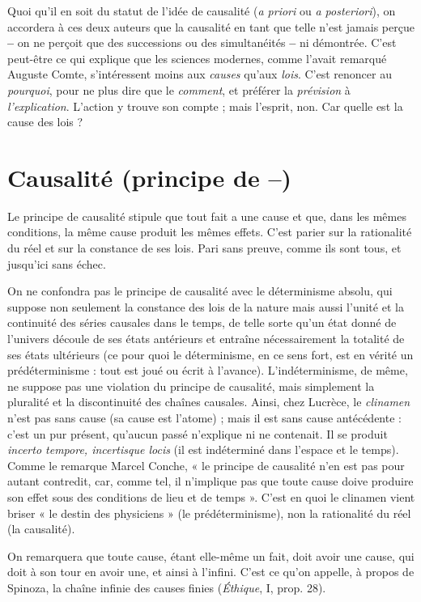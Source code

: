 Quoi qu'il en soit du statut de l’idée de causalité ({\it a priori} ou {\it a posteriori}),
on accordera à ces deux auteurs que la causalité en tant que telle n’est jamais
perçue {\bf --} on ne perçoit que des successions ou des simultanéités {\bf --} ni démontrée.
C’est peut-être ce qui explique que les sciences modernes, comme l'avait
remarqué Auguste Comte, s'intéressent moins aux {\it causes} qu'aux {\it lois}. C’est
renoncer au {\it pourquoi}, pour ne plus dire que le {\it comment}, et préférer la {\it prévision}
à {\it l'explication}. L'action y trouve son compte ; mais l'esprit, non. Car quelle est
la cause des lois ?

\section{Causalité (principe de {\bf --})}
Le principe de causalité stipule que tout
fait a une cause et que, dans les mêmes
conditions, la même cause produit les mêmes effets. C’est parier sur la rationalité
du réel et sur la constance de ses lois. Pari sans preuve, comme ils sont tous,
et jusqu'ici sans échec.

On ne confondra pas le principe de causalité avec le déterminisme absolu,
qui suppose non seulement la constance des lois de la nature mais aussi l’unité
et la continuité des séries causales dans le temps, de telle sorte qu’un état donné
de l'univers découle de ses états antérieurs et entraîne nécessairement la totalité
de ses états ultérieurs (ce pour quoi le déterminisme, en ce sens fort, est en
vérité un prédéterminisme : tout est joué ou écrit à l'avance). L’indéterminisme,
de même, ne suppose pas une violation du principe de causalité, mais
simplement la pluralité et la discontinuité des chaînes causales. Ainsi, chez
Lucrèce, le {\it clinamen} n’est pas sans cause (sa cause est l’atome) ; mais il est sans
cause antécédente : c’est un pur présent, qu'aucun passé n’explique ni ne contenait.
Il se produit {\it incerto tempore, incertisque locis} (il est indéterminé dans
l’espace et le temps). Comme le remarque Marcel Conche, « le principe de causalité
n’en est pas pour autant contredit, car, comme tel, il n’implique pas que
toute cause doive produire son effet sous des conditions de lieu et de temps ».
C’est en quoi le clinamen vient briser « le destin des physiciens » (le prédéterminisme),
non la rationalité du réel (la causalité).

On remarquera que toute cause, étant elle-même un fait, doit avoir une
cause, qui doit à son tour en avoir une, et ainsi à l’infini. C’est ce qu’on appelle,
à propos de Spinoza, la chaîne infinie des causes finies ({\it Éthique}, I, prop. 28).


